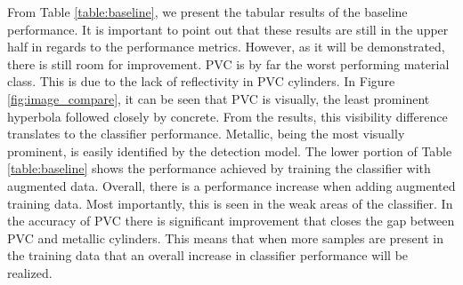 \hspace{0.5in}From Table \ref{table:baseline}, we present the tabular results of the baseline performance. It is important to point out that these results are still in the upper half in regards to the performance metrics. However, as it will be demonstrated, there is still room for improvement. PVC is by far the worst performing material class. This is due to the lack of reflectivity in PVC cylinders. In Figure \ref{fig:image_compare}, it can be seen that PVC is visually, the least prominent hyperbola followed closely by concrete. From the results, this visibility difference translates to the classifier performance. Metallic, being the most visually prominent, is easily identified by the detection model. The lower portion of Table \ref{table:baseline} shows the performance achieved by training the classifier with augmented data. Overall, there is a performance increase when adding augmented training data. Most importantly, this is seen in the weak areas of the classifier. In the accuracy of PVC there is significant improvement that closes the gap between PVC and metallic cylinders. This means that when more samples are present in the training data that an overall increase in classifier performance will be realized.
\vspace{0.5\baselineskip}

